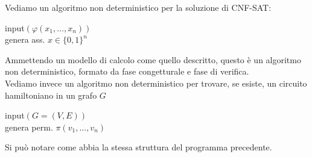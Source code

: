 Vediamo un algoritmo non deterministico per la soluzione di CNF-SAT:
\begin{center}
	\begin{minipage}{.55\textwidth}
		\begin{tcolorbox}[
			colback=white,
			sharp corners,
			boxrule=.3mm,
			left=20pt,
			top=0pt,
			bottom=0pt,
			colbacktitle=white,
			coltitle=black
			]
			\begin{algorithm}[H]
				\SetAlgoNoEnd
				input$(\varphi (x_1, \dots, x_n))$\\
				genera ass. $x \in \{0,1\}^n$\\
			\end{algorithm}
		\end{tcolorbox}
	\end{minipage}
\end{center}

Ammettendo un modello di calcolo come quello descritto, questo è un algoritmo non deterministico, formato da fase congetturale e fase di verifica.\\

Vediamo invece un algoritmo non deterministico per trovare, se esiste, un circuito hamiltoniano in un grafo $G$
\begin{center}
	\begin{minipage}{.7\textwidth}
		\begin{tcolorbox}[
			colback=white,
			sharp corners,
			boxrule=.3mm,
			left=20pt,
			top=0pt,
			bottom=0pt,
			colbacktitle=white,
			coltitle=black
			]
			\begin{algorithm}[H]
				\SetAlgoNoEnd
				input$(G = (V,E))$\\
				genera perm. $\pi (v_1, \dots, v_n)$\\
			\end{algorithm}
		\end{tcolorbox}
	\end{minipage}
\end{center}

Si può notare come abbia la stessa struttura del programma precedente.\\

